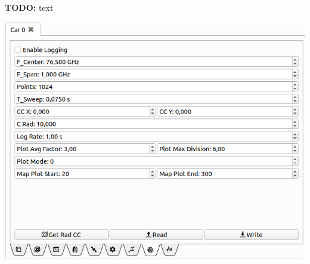 \documentclass[12pt]{article} %
\newcommand{\todo}[1]{{\color{red} \textbf{TODO:} #1}}
\begin{document}
\noindent\begin{minipage}{0.5\textwidth} %
  \todo{text}
\end{minipage}
\begin{minipage}{0.5\textwidth}
  \noindent \includegraphics[width=\textwidth]{./screens/Car_radar.png}    
\end{minipage}
\end{document}
